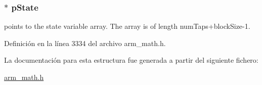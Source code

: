 \subsubsection[{\texorpdfstring{p\+State}{pState}}]{$\ast$ p\+State}\hypertarget{structarm__fir__decimate__instance__q31_adee4ba3ee8869865af7d8fa08ca913d6}{}\label{structarm__fir__decimate__instance__q31_adee4ba3ee8869865af7d8fa08ca913d6}
points to the state variable array. The array is of length num\+Taps+block\+Size-\/1. 

Definición en la línea 3334 del archivo arm\+\_\+math.\+h.



La documentación para esta estructura fue generada a partir del siguiente fichero\+:\begin{DoxyCompactItemize}
\item 
\hyperlink{arm__math_8h}{arm\+\_\+math.\+h}\end{DoxyCompactItemize}
